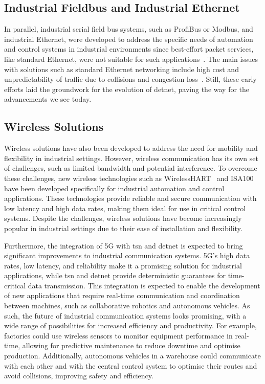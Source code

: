 \documentclass[runningheads]{llncs}
\begin{document}
\subsection*{Industrial Fieldbus and Industrial Ethernet}
In parallel, industrial serial field bus systems, such as ProfiBus or Modbus, and industrial Ethernet, were developed to address the specific needs of automation and control systems in industrial environments since best-effort packet services, like standard Ethernet, were not suitable for such applications~\cite{Sauter2010}. The main issues with solutions such as standard Ethernet networking include high cost and unpredictability of traffic due to collisions and congestion loss~\cite{Finn2018}. Still, these early efforts laid the groundwork for the evolution of \gls{detnet}, paving the way for the advancements we see today. 

\subsection*{Wireless Solutions}
Wireless solutions have also been developed to address the need for mobility and flexibility in industrial settings. However, wireless communication has its own set of challenges, such as limited bandwidth and potential interference. To overcome these challenges, new wireless technologies such as WirelessHART~\cite{Song2008} and ISA100~\cite{Adriano2018} have been developed specifically for industrial automation and control applications. These technologies provide reliable and secure communication with low latency and high data rates, making them ideal for use in critical control systems. Despite the challenges, wireless solutions have become increasingly popular in industrial settings due to their ease of installation and flexibility.

Furthermore, the integration of 5G with \gls{tsn} and \gls{detnet} is expected to bring significant improvements to industrial communication systems. 5G's high data rates, low latency, and reliability make it a promising solution for industrial applications, while \gls{tsn} and \gls{detnet} provide deterministic guarantees for time-critical data transmission. This integration is expected to enable the development of new applications that require real-time communication and coordination between machines, such as collaborative robotics and autonomous vehicles. As such, the future of industrial communication systems looks promising, with a wide range of possibilities for increased efficiency and productivity. For example, factories could use wireless sensors to monitor equipment performance in real-time, allowing for predictive maintenance to reduce downtime and optimise production. Additionally, autonomous vehicles in a warehouse could communicate with each other and with the central control system to optimise their routes and avoid collisions, improving safety and efficiency.~\cite{Atiq2022}
\end{document}
